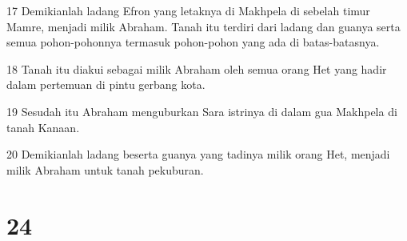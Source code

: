 \par 17 Demikianlah ladang Efron yang letaknya di Makhpela di sebelah timur Mamre, menjadi milik Abraham. Tanah itu terdiri dari ladang dan guanya serta semua pohon-pohonnya termasuk pohon-pohon yang ada di batas-batasnya.
\par 18 Tanah itu diakui sebagai milik Abraham oleh semua orang Het yang hadir dalam pertemuan di pintu gerbang kota.
\par 19 Sesudah itu Abraham menguburkan Sara istrinya di dalam gua Makhpela di tanah Kanaan.
\par 20 Demikianlah ladang beserta guanya yang tadinya milik orang Het, menjadi milik Abraham untuk tanah pekuburan.

\chapter{24}

